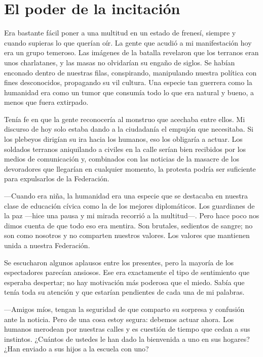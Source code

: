 \chapter{El poder de la incitación}\label{sec:el-poder-de-la-incitacion}

Era bastante fácil poner a una multitud en un estado de frenesí, siempre y cuando supieras lo que querían oír. La gente que acudió a mi manifestación hoy era un grupo temeroso. Las imágenes de la batalla revelaron que los terranos eran unos charlatanes, y las masas no olvidarían su engaño de siglos. Se habían enconado dentro de nuestras filas, conspirando, manipulando nuestra política con fines desconocidos, propagando su vil cultura. Una especie tan guerrera como la humanidad era como un tumor que consumía todo lo que era natural y bueno, a menos que fuera extirpado.

Tenía fe en que la gente reconocería al monstruo que acechaba entre ellos. Mi discurso de hoy solo estaba dando a la ciudadanía el empujón que necesitaba. Si los plebeyos dirigían su ira hacia los humanos, eso los obligaría a actuar. Los soldados terranos aniquilando a civiles en la calle serían bien recibidos por los medios de comunicación y, combinados con las noticias de la masacre de los devoradores que llegarían en cualquier momento, la protesta podría ser suficiente para expulsarlos de la Federación.

—Cuando era niña, la humanidad era una especie que se destacaba en nuestra clase de educación cívica como la de los mejores diplomáticos. Los guardianes de la paz —hice una pausa y mi mirada recorrió a la multitud—. Pero hace poco nos dimos cuenta de que todo eso era mentira. Son brutales, sedientos de sangre; no son como nosotros y no comparten nuestros valores. Los valores que mantienen unida a nuestra Federación.

Se escucharon algunos aplausos entre los presentes, pero la mayoría de los espectadores parecían ansiosos. Ese era exactamente el tipo de sentimiento que esperaba despertar; no hay motivación más poderosa que el miedo. Sabía que tenía toda su atención y que estarían pendientes de cada una de mi palabras.

—Amigos míos, tengan la seguridad de que comparto su sorpresa y confusión ante la noticia. Pero de una cosa estoy segura: debemos actuar ahora. Los humanos merodean por nuestras calles y es cuestión de tiempo que cedan a sus instintos. ¿Cuántos de ustedes le han dado la bienvenida a uno en sus hogares? ¿Han enviado a sus hijos a la escuela con uno?

